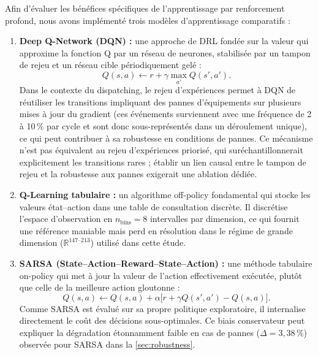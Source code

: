 \documentclass[11pt,a4paper]{article}
\begin{document}
Afin d'évaluer les bénéfices spécifiques de l'apprentissage par renforcement profond, nous avons implémenté trois modèles d'apprentissage comparatifs :

\begin{enumerate}
  \item \textbf{Deep Q-Network (DQN) :} une approche de DRL fondée sur la valeur qui approxime la fonction Q par un réseau de neurones, stabilisée par un tampon de rejeu et un réseau cible périodiquement gelé :
  \begin{equation}
  Q(s,a) \leftarrow r + \gamma \max_{a'} Q(s', a') .
  \end{equation}
  Dans le contexte du dispatching, le rejeu d'expériences permet à DQN de réutiliser les transitions impliquant des pannes d'équipements sur plusieurs mises à jour du gradient (ces événements surviennent avec une fréquence de 2 à 10\,\% par cycle et sont donc sous-représentés dans un déroulement unique), ce qui peut contribuer à sa robustesse en conditions de pannes. Ce mécanisme n'est pas équivalent au rejeu d'expériences priorisé, qui suréchantillonnerait explicitement les transitions rares ; établir un lien causal entre le tampon de rejeu et la robustesse aux pannes exigerait une ablation dédiée.

  \item \textbf{Q-Learning tabulaire :} un algorithme off-policy fondamental qui stocke les valeurs état--action dans une table de consultation discrète. Il discrétise l'espace d'observation en $n_{\text{bins}}=8$ intervalles par dimension, ce qui fournit une référence maniable mais perd en résolution dans le régime de grande dimension ($\mathbb{R}^{147\text{--}213}$) utilisé dans cette étude.

  \item \textbf{SARSA (State--Action--Reward--State--Action) :} une méthode tabulaire on-policy qui met à jour la valeur de l'action effectivement exécutée, plutôt que celle de la meilleure action gloutonne :
  \begin{equation}
  Q(s,a) \leftarrow Q(s,a) + \alpha \big[ r + \gamma Q(s',a') - Q(s,a) \big] .
  \end{equation}
  Comme SARSA est évalué sur sa propre politique exploratoire, il internalise directement le coût des décisions sous-optimales. Ce biais conservateur peut expliquer la dégradation étonnamment faible en cas de pannes ($\Delta=3{,}38\,\%$) observée pour SARSA dans la \cref{sec:robustness}.
\end{enumerate}
\end{document}
